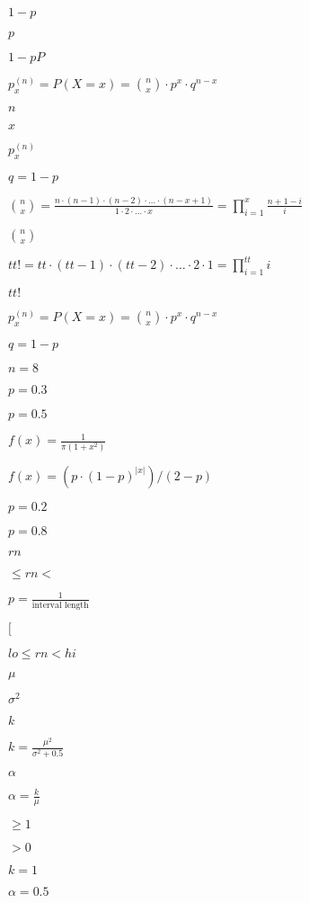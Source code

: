 \documentclass{article}
\begin{document}
$1 - p$
\pagebreak

$p$
\pagebreak

$1 - pP$
\pagebreak

$ p_x^{(n)} = P(X = x) = {n \choose x} \cdot p^x \cdot q^{n-x} $
\pagebreak

$n$
\pagebreak

$x$
\pagebreak

$p_x^{(n)}$
\pagebreak

$q = 1 -p$
\pagebreak

$ {n \choose x} = \frac{n \cdot (n-1) \cdot (n-2) \cdot \dots \cdot (n-x+1)}{1 \cdot 2 \cdot \dots \cdot x} = \prod_{i=1}^x \frac{n+1-i}{i} $
\pagebreak

${n \choose x}$
\pagebreak

$ tt! = tt \cdot (tt - 1) \cdot (tt - 2) \cdot \dots \cdot 2 \cdot 1 = \prod_{i=1}^{tt} i $
\pagebreak

$tt!$
\pagebreak

$p_x^{(n)} = P(X = x) = {n \choose x} \cdot p^x \cdot q^{n-x}$
\pagebreak

$q = 1 - p$
\pagebreak

$n = 8$
\pagebreak

$p = 0.3$
\pagebreak

$p = 0.5$
\pagebreak

$ f(x) = \frac{1}{\pi (1 + x^2)} $
\pagebreak

$ f(x) = ( p \cdot (1 - p)^{|x|} ) / (2 - p) $
\pagebreak

$p = 0.2$
\pagebreak

$p = 0.8$
\pagebreak

$rn$
\pagebreak

$\leq rn <$
\pagebreak

$p = \frac{1}{\mbox{interval length}}$
\pagebreak

$[$
\pagebreak

$lo \leq rn < hi$
\pagebreak

$\mu$
\pagebreak

$\sigma^2$
\pagebreak

$k$
\pagebreak

$k = \frac{\mu^2}{\sigma^2+0.5}$
\pagebreak

$\alpha$
\pagebreak

$\alpha = \frac{k}{\mu}$
\pagebreak

$\geq 1$
\pagebreak

$> 0$
\pagebreak

$k = 1$
\pagebreak

$\alpha = 0.5$
\pagebreak
\end{document}
